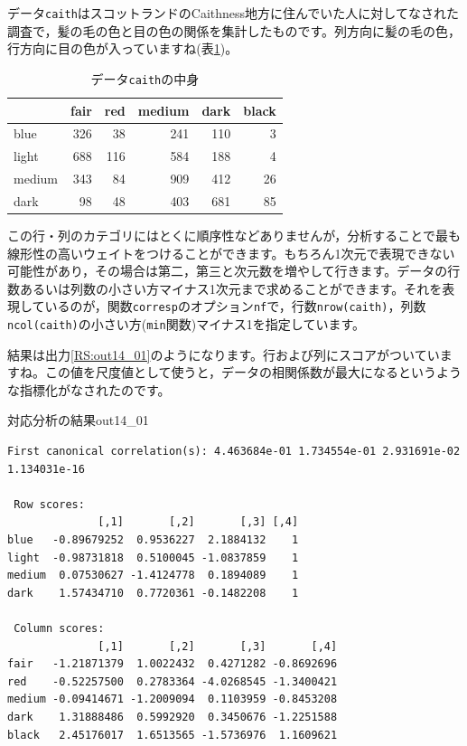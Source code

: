 \documentclass{ltjsbook}
\begin{document}
データ\texttt{caith}はスコットランドのCaithness地方に住んでいた人に対してなされた調査で，髪の毛の色と目の色の関係を集計したものです。列方向に髪の毛の色，行方向に目の色が入っていますね(表\ref{tbl::14_06})。

\begin{table}[ht]
	\caption{データ\texttt{caith}の中身}
	\centering
	\begin{tabular}{lrrrrr}
		\hline
		       & fair & red & medium & dark & black \\\hline
		\hline
		blue   & 326  & 38  & 241    & 110  & 3     \\
		light  & 688  & 116 & 584    & 188  & 4     \\
		medium & 343  & 84  & 909    & 412  & 26    \\
		dark   & 98   & 48  & 403    & 681  & 85    \\
		\hline
	\end{tabular}
	\label{tbl::14_06}
\end{table}

この行・列のカテゴリにはとくに順序性などありませんが，分析することで最も線形性の高いウェイトをつけることができます。もちろん1次元で表現できない可能性があり，その場合は第二，第三と次元数を増やして行きます。データの行数あるいは列数の小さい方マイナス1次元まで求めることができます。それを表現しているのが，関数\texttt{corresp}のオプション\texttt{nf}で，行数\texttt{nrow(caith)}，列数\texttt{ncol(caith)}の小さい方(\texttt{min}関数)マイナス1を指定しています。

結果は出力\ref{RS:out14_01}のようになります。行および列にスコアがついていますね。この値を尺度値として使うと，データの相関係数が最大になるというような指標化がなされたのです。
\begin{Rscreen}{対応分析の結果}{out14_01}
	\begin{verbatim}
First canonical correlation(s): 4.463684e-01 1.734554e-01 2.931691e-02 1.134031e-16 

 Row scores:
              [,1]       [,2]       [,3] [,4]
blue   -0.89679252  0.9536227  2.1884132    1
light  -0.98731818  0.5100045 -1.0837859    1
medium  0.07530627 -1.4124778  0.1894089    1
dark    1.57434710  0.7720361 -0.1482208    1

 Column scores:
              [,1]       [,2]       [,3]       [,4]
fair   -1.21871379  1.0022432  0.4271282 -0.8692696
red    -0.52257500  0.2783364 -4.0268545 -1.3400421
medium -0.09414671 -1.2009094  0.1103959 -0.8453208
dark    1.31888486  0.5992920  0.3450676 -1.2251588
black   2.45176017  1.6513565 -1.5736976  1.1609621
\end{verbatim}
\end{Rscreen}
\end{document}
